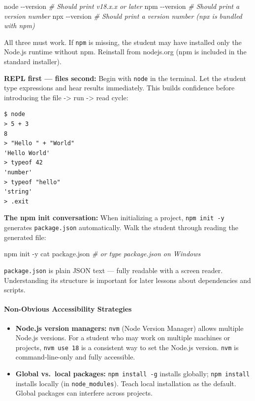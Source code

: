 \documentclass[
  justified,
  openright,
]{tufte-book}
\let\paragraph\paragraph
\newcommand{\CommentTok}[1]{\textcolor{CodeComment}{\textit{#1}}}  %
\newcommand{\CodeFuncTok}[1]{\textcolor{CodeKeyword}{#1}}           %
\newcommand{\CodeTypeTok}[1]{\textcolor{CodeType}{#1}}              %
\newenvironment{Shaded}{%
  \begin{mdframed}[style=TufteCode]%
}{%
  \end{mdframed}%
}
\let\paragraph\paragraph
\providecommand{\tightlist}{%
  \setlength{\itemsep}{0pt}\setlength{\parskip}{0pt}}
\begin{document}
\begin{Shaded}
\begin{Highlighting}[]
node \CodeTypeTok{{-}{-}version}    \CommentTok{\# Should print v18.x.x or later}
npm \CodeTypeTok{{-}{-}version}     \CommentTok{\# Should print a version number}
npx \CodeTypeTok{{-}{-}version}     \CommentTok{\# Should print a version number (npx is bundled with npm)}
\end{Highlighting}
\end{Shaded}

All three must work. If \texttt{npm} is missing, the student may have
installed only the Node.js runtime without npm. Reinstall from
nodejs.org (npm is included in the standard installer).

\textbf{REPL first --- files second:} Begin with \texttt{node} in the
terminal. Let the student type expressions and hear results immediately.
This builds confidence before introducing the file -\textgreater{} run
-\textgreater{} read cycle:

\begin{verbatim}
$ node
> 5 + 3
8
> "Hello " + "World"
'Hello World'
> typeof 42
'number'
> typeof "hello"
'string'
> .exit
\end{verbatim}

\textbf{The npm init conversation:} When initializing a project,
\texttt{npm\ init\ -y} generates \texttt{package.json} automatically.
Walk the student through reading the generated file:

\begin{Shaded}
\begin{Highlighting}[]
npm init \CodeTypeTok{{-}y}
\CodeFuncTok{cat} package.json   \CommentTok{\# or type package.json on Windows}
\end{Highlighting}
\end{Shaded}

\texttt{package.json} is plain JSON text --- fully readable with a
screen reader. Understanding its structure is important for later
lessons about dependencies and scripts.

\paragraph{Non-Obvious Accessibility
Strategies}\label{non-obvious-accessibility-strategies-2}

\begin{itemize}
\tightlist
\item
  \textbf{Node.js version managers:} \texttt{nvm} (Node Version Manager)
  allows multiple Node.js versions. For a student who may work on
  multiple machines or projects, \texttt{nvm\ use\ 18} is a consistent
  way to set the Node.js version. \texttt{nvm} is command-line-only and
  fully accessible.
\item
  \textbf{Global vs.~local packages:} \texttt{npm\ install\ -g} installs
  globally; \texttt{npm\ install} installs locally (in
  \texttt{node\_modules}). Teach local installation as the default.
  Global packages can interfere across projects.
\end{itemize}
\end{document}
